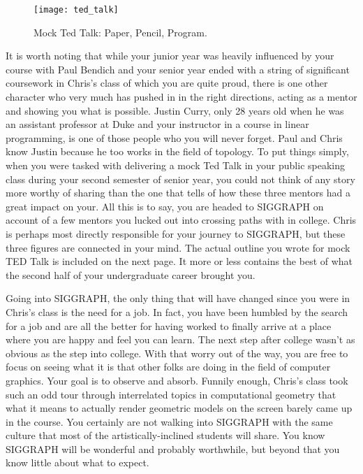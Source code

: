\documentclass[../main.tex]{subfiles}
\begin{document}
\begin{figure}[h!]
	\centering
	\texttt{[image: ted\_talk]}
	\caption*{Mock Ted Talk: Paper, Pencil, Program.}
\end{figure}

It is worth noting that while your junior year was heavily influenced by your course with Paul Bendich and your senior year ended with a string of significant coursework in Chris's class of which you are quite proud, there is one other character who very much has pushed in in the right directions, acting as a mentor and showing you what is possible. Justin Curry, only 28 years old when he was an assistant professor at Duke and your instructor in a course in linear programming, is one of those people who you will never forget. Paul and Chris know Justin because he too works in the field of topology. To put things simply, when you were tasked with delivering a mock Ted Talk in your public speaking class during your second semester of senior year, you could not think of any story more worthy of sharing than the one that tells of how these three mentors had a great impact on your. All this is to say, you are headed to SIGGRAPH on account of a few mentors you lucked out into crossing paths with in college. Chris is perhaps most directly responsible for your journey to SIGGRAPH, but these three figures are connected in your mind. The actual outline you wrote for mock TED Talk is included on the next page. It more or less contains the best of what the second half of your undergraduate career brought you.

Going into SIGGRAPH, the only thing that will have changed since you were in Chris's class is the need for a job. In fact, you have been humbled by the search for a job and are all the better for having worked to finally arrive at a place where you are happy and feel you can learn. The next step after college wasn't as obvious as the step into college. With that worry out of the way, you are free to focus on seeing what it is that other folks are doing in the field of computer graphics. Your goal is to observe and absorb. Funnily enough, Chris's class took such an odd tour through interrelated topics in computational geometry that what it means to actually render geometric models on the screen barely came up in the course. You certainly are not walking into SIGGRAPH with the same culture that most of the artistically-inclined students will share. You know SIGGRAPH will be wonderful and probably worthwhile, but beyond that you know little about what to expect.


\end{document}
